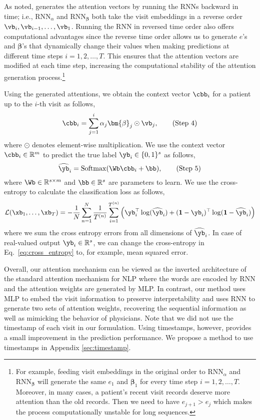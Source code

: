 As noted, \alg generates the attention vectors by running the RNNs backward in time;  i.e., $\mathrm{RNN}_{\alpha}$ and $\mathrm{RNN}_{\bm{\beta}}$ both take the visit embeddings in a reverse order $\vb_i, \vb_{i-1}, \ldots, \vb_1$. Running the RNN in reversed time order also offers computational advantages since the reverse time order allows us to generate $e$'s and $\bm{\beta}$'s that dynamically change their values when making predictions at different time steps $i=1, 2, \ldots, T$.
This ensures that the attention vectors are modified at each time step, increasing the computational stability of the attention generation process.\footnote{For example, feeding visit embeddings in the original order to $\mathrm{RNN}_{\alpha}$ and $\mathrm{RNN}_{\bm{\beta}}$ will generate the same $e_1$ and $\bm{\beta}_1$ for every time step $i=1, 2, \ldots, T$. Moreover, in many cases, a patient's recent visit records deserve more attention than the old records. Then we need to have $e_{j+1}>e_{j}$ which makes the process computationally unstable for long sequences.} 


Using the generated attentions, we obtain the context vector $\cbb_i$ for a patient up to the $i$-th visit as follows,
\begin{equation}
\cbb_i = \sum_{j=1}^{i} \alpha_j \bm{\beta}_j \odot \vb_j, \tag{Step 4} \label{eq:context}
\end{equation}
where $\odot$ denotes element-wise multiplication. We use the context vector $\cbb_i \in \mathbb{R}^{m}$ to predict the true label $\yb_i \in \{0,1\}^{s}$ as follows,
\begin{equation}
\widehat{\yb}_{i} = \mathrm{Softmax}(\Wb\cbb_i + \bb), \label{eq:softmax} \tag{Step 5}
\end{equation}
where $\Wb \in \mathbb{R}^{s \times m}$ and $\bb \in \mathbb{R}^{s}$ are parameters to learn. We use the cross-entropy to calculate the classification loss as follows, 
\begin{equation} 
\mathcal{L}(\xb_1, \ldots, \xb_T) = -\frac{1}{N}\sum_{n=1}^{N} \frac{1}{T^{(n)}} \sum_{i=1}^{T^{(n)}} \Big( \yb_{i}^{\top} \log(\widehat{\yb}_{i}) + (\mathbf{1} - \yb_{i})^{\top}  \log(\mathbf{1} - \widehat{\yb}_{i})  \Big) \label{eq:cross_entropy}
\end{equation}
where we sum the cross entropy errors from all dimensions of $\widehat{\yb}_{i}$. In case of real-valued output $\yb_i \in \mathbb{R}^{s}$, we can change the cross-entropy in Eq.~\eqref{eq:cross_entropy} to, for example, mean squared error.

Overall, our attention mechanism can be viewed as the inverted architecture of the standard attention mechanism for NLP \cite{bahdanau2014neural} where the words are encoded by RNN and the attention weights are generated by MLP. In contrast, our method uses MLP to embed the visit information to preserve interpretability and uses RNN to generate two sets of attention weights, recovering the sequential information as well as mimicking the behavior of physicians. 
Note that we did not use the timestamp of each visit in our formulation. Using timestamps, however, provides a small improvement in the prediction performance. We propose a method to use timestamps in	 Appendix \ref{sec:timestamp}.
